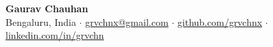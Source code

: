 \textbf{\huge Gaurav Chauhan} \\
\vspace{5pt}
Bengaluru, India
$\cdot$ \href{mailto:grvchnx@gmail.com}{grvchnx@gmail.com}
$\cdot$ \href{https://github.com/grvchnx}{github.com/grvchnx}
$\cdot$ \href{https://linkedin.com/in/grvchn}{linkedin.com/in/grvchn}
